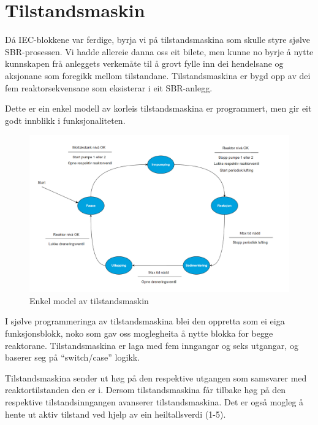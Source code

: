 \section{Tilstandsmaskin}
\thispagestyle{fancy}

Då \gls{IEC}-blokkene var ferdige, byrja vi på tilstandsmaskina som skulle styre sjølve \gls{SBR}-prosessen. 
Vi hadde allereie danna oss eit bilete, men kunne no byrje å nytte kunnskapen frå anleggets verkemåte
til å grovt fylle inn dei hendelsane og aksjonane som foregikk mellom tilstandane. 
Tilstandsmaskina er bygd opp av dei fem reaktorsekvensane som eksisterar i eit \gls{SBR}-anlegg.

Dette er ein enkel modell av korleis tilstandsmaskina er programmert, men gir eit godt innblikk i \newline funksjonaliteten. \newline \newline \newline \newline \newline

\begin{figure}[htbp]
    \centering
    \includegraphics[width=1\textwidth]{Figurar/Simpel tilstandsmaskin.png}
    \caption{Enkel model av tilstandsmaskin}\label{fig:SimpelTilstandsmaskin}
\end{figure}


\newpage

I sjølve programmeringa av tilstandsmaskina blei den oppretta som ei eiga funksjonsblokk, noko som gav oss moglegheita å nytte blokka for begge reaktorane.
Tilstandsmaskina er laga med fem inngangar og seks utgangar, og baserer seg på ``switch/case'' logikk.

Tilstandsmaskina sender ut høg på den respektive utgangen som samsvarer med reaktortilstanden den er i. Dersom tilstandsmaskina får tilbake
høg på den respektive tilstandsinngangen avanserer \newline tilstandsmaskina.
Det er også mogleg å hente ut aktiv tilstand ved hjelp av ein heiltallsverdi (1-5). \newline \newline \newline \newline

